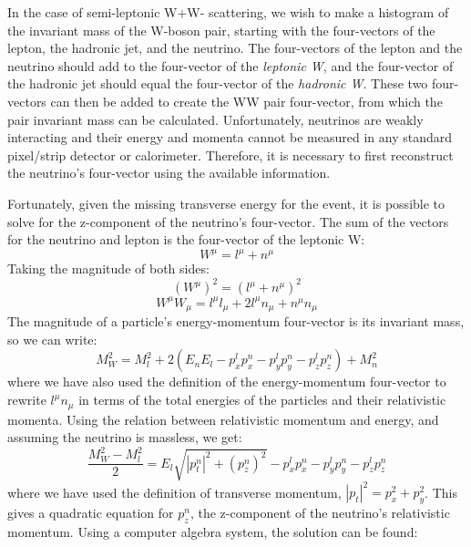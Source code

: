 \documentclass[10pt]{ucscthesisbs}
\begin{document}
In the case of semi-leptonic W+W- scattering, we wish to make a histogram of the invariant mass of the W-boson pair, starting with the four-vectors of the lepton, the hadronic jet, and the neutrino. The four-vectors of the lepton and the neutrino should add to the four-vector of the \textit{leptonic W}, and the four-vector of the hadronic jet should equal the four-vector of the \textit{hadronic W}. These two four-vectors can then be added to create the WW pair four-vector, from which the pair invariant mass can be calculated. Unfortunately, neutrinos are weakly interacting and their energy and momenta cannot be measured in any standard pixel/strip detector or calorimeter. Therefore, it is necessary to first reconstruct the neutrino's four-vector using the available information.

Fortunately, given the missing transverse energy for the event, it is possible to solve for the z-component of the neutrino's four-vector. The sum of the vectors for the neutrino and lepton is the four-vector of the leptonic W:
\begin{equation}W^{\mu} = l^{\mu} + n^{\mu} \end{equation}
Taking the magnitude of both sides:
\begin{equation}(W^{\mu})^2 = (l^{\mu} + n^{\mu})^2 \end{equation}
\begin{equation}W^{\mu}W_{\mu} = l^{\mu}l_{\mu} + 2l^{\mu}n_{\mu} + n^{\mu}n_{\mu} \end{equation}
The magnitude of a particle's energy-momentum four-vector is its invariant mass, so we can write:
\begin{equation}M_W^2 = M_l^2 + 2(E_nE_l - p_x^lp_x^n - p_y^lp_y^n - p_z^lp_z^n) + M_n^2 \end{equation}
where we have also used the definition of the energy-momentum four-vector to rewrite $l^{\mu}n_{\mu}$ in terms of the total energies of the particles and their relativistic momenta. Using the relation between relativistic momentum and energy, and assuming the neutrino is massless, we get:
\begin{equation}\frac{M_W^2 - M_l^2}{2} = E_l\sqrt{|p_t^n|^2 + (p_z^n)^2} - p_x^lp_x^n - p_y^lp_y^n - p_z^lp_z^n \end{equation}
where we have used the definition of transverse momentum, $|p_t|^2 = p_x^2 + p_y^2$. This gives a quadratic equation for $p_z^n$, the z-component of the neutrino's relativistic momentum. Using a computer algebra system, the solution can be found: \cite{moreno2009}
\end{document}
